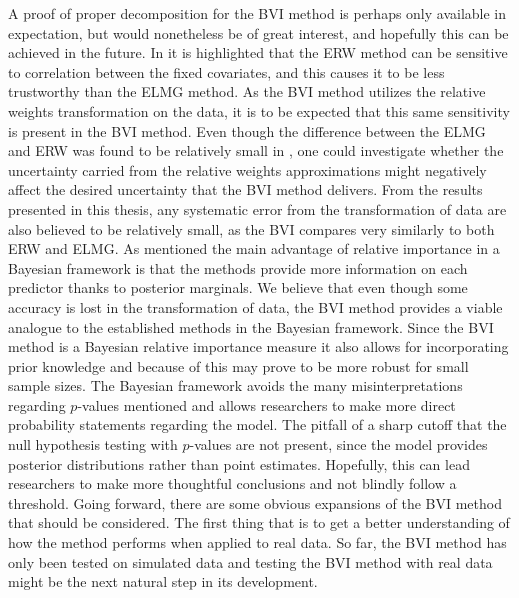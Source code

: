 A proof of proper decomposition for the BVI method is perhaps only available in expectation, but would nonetheless be of great interest, and hopefully this can be achieved in the future. 
\newline
\newline
In \citet[section 6.1]{matre} it is highlighted that the ERW method can be sensitive to correlation between the fixed covariates, and this causes it to be less trustworthy than the ELMG method.
As the BVI method utilizes the relative weights transformation on the data, it is to be expected that this same sensitivity is present in the BVI method.
Even though the difference between the ELMG and ERW was found to be relatively small in \citet{matre}, one could investigate whether the uncertainty carried from the relative weights approximations might negatively affect the desired uncertainty that the BVI method delivers. 
From the results presented in this thesis, any systematic error from the transformation of data are also believed to be relatively small, as the BVI compares very similarly to both ERW and ELMG.
\newline
\newline
As mentioned the main advantage of relative importance in a Bayesian framework is that the methods provide more information on each predictor thanks to posterior marginals.
We believe that even though some accuracy is lost in the transformation of data, the BVI method provides a viable analogue to the established methods in the Bayesian framework.
Since the BVI method is a Bayesian relative importance measure it also allows for incorporating prior knowledge and because of this may prove to be more robust for small sample sizes. 
The Bayesian framework avoids the many misinterpretations regarding $p$-values mentioned and allows researchers to make more direct probability statements regarding the model.
The pitfall of a sharp cutoff that the null hypothesis testing with $p$-values are not present, since the model provides posterior distributions rather than point estimates.
Hopefully, this can lead researchers to make more thoughtful conclusions and not blindly follow a threshold.
\newline
\newline
Going forward, there are some obvious expansions of the BVI method that should be considered.
The first thing that is to get a better understanding of how the method performs when applied to real data.
So far, the BVI method has only been tested on simulated data and testing the BVI method with real data might be the next natural step in its development. 
